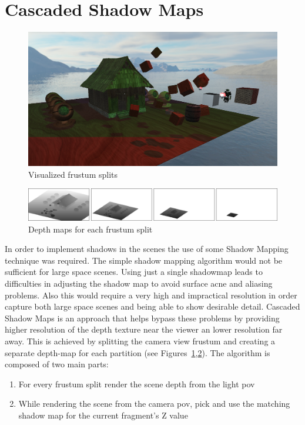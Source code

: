 \section{Cascaded Shadow Maps}

\begin{figure}[h]
    \centering
    \includegraphics[scale=0.25, clip=true]{./image/csmsplits.png}
    \caption{Visualized frustum splits}
\label{fig:csmsplits}
\end{figure}

\begin{figure}[b]
    \centering
    \includegraphics[scale=0.3, clip=true]{./image/csmbufs.png}
    \caption{Depth maps for each frustum split}
\label{fig:csmbufs}
\end{figure}

In order to implement shadows in the scenes the use of some Shadow Mapping technique was required.
The simple shadow mapping algorithm would not be sufficient for large space scenes. Using just
a single shadowmap leads to difficulties in adjusting the shadow map to avoid surface acne and aliasing
problems. Also this would require a very high and impractical resolution in order capture both large
space scenes and being able to show desirable detail. Cascaded Shadow Maps is an approach that helps bypass
these problems by providing higher resolution of the depth texture near the viewer an lower resolution far
away. This is achieved by splitting the camera view frustum and creating a separate depth-map for each
partition (see Figures~\ref{fig:csmsplits},\ref{fig:csmbufs}). The algorithm is composed of two main parts:

\begin{enumerate}
\item For every frustum split render the scene depth from the light pov
\item While rendering the scene from the camera pov, pick and use the matching shadow map for the current
    fragment's Z value
\end{enumerate}
